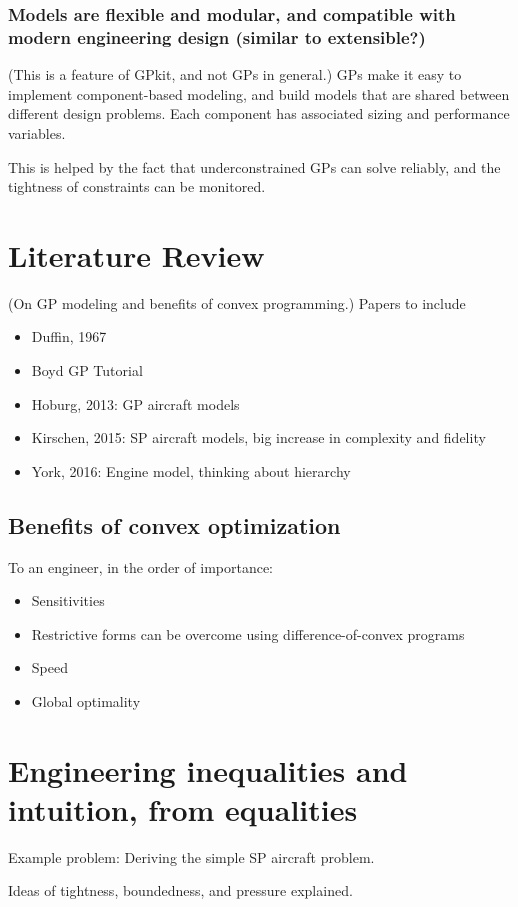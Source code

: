 \documentclass{aiaa-pretty}
\begin{document}
\subsubsection{Models are flexible and modular, and compatible with modern engineering design (similar to extensible?)}
(This is a feature of GPkit, and not GPs in general.)
\gls{GP}s make it easy to implement component-based modeling, and build models that are shared between different design problems. Each component has associated sizing and performance variables. 

This is helped by the fact that underconstrained \gls{GP}s can solve reliably, and the tightness of constraints can be monitored. 

\section{Literature Review}
(On GP modeling and benefits of convex programming.)
Papers to include
\begin{itemize}
\item Duffin, 1967
\item Boyd GP Tutorial
\item Hoburg, 2013: GP aircraft models
\item Kirschen, 2015: SP aircraft models, big increase in complexity and fidelity
\item York, 2016: Engine model, thinking about hierarchy
\end{itemize}
\subsection{Benefits of convex optimization}
To an engineer, in the order of importance:
\begin{itemize}
\item Sensitivities
\item Restrictive forms can be overcome using difference-of-convex programs
\item Speed
\item Global optimality
\end{itemize}

\section{Engineering inequalities and intuition, from equalities}

Example problem: Deriving the simple SP aircraft problem. 

Ideas of tightness, boundedness, and pressure explained. 
\end{document}
